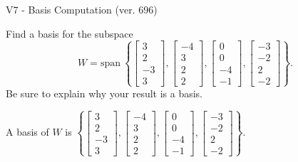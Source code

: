 \begin{exercise}
  \begin{exerciseTitle}V7 - Basis Computation (ver. 696)\end{exerciseTitle}
  \begin{exerciseStatement}
    Find a basis for the subspace 
\[W=\mathrm{span}\ \left\{\left[\begin{array}{r}
3 \\
2 \\
-3 \\
3
\end{array}\right] , \left[\begin{array}{r}
-4 \\
3 \\
2 \\
2
\end{array}\right] , \left[\begin{array}{r}
0 \\
0 \\
-4 \\
-1
\end{array}\right] , \left[\begin{array}{r}
-3 \\
-2 \\
2 \\
-2
\end{array}\right]\right\}.\]
 Be sure to explain why your result is a basis.


  \end{exerciseStatement}
  \begin{exerciseAnswer}
   A basis of \(W\) is  \(\left\{\left[\begin{array}{r}
3 \\
2 \\
-3 \\
3
\end{array}\right] , \left[\begin{array}{r}
-4 \\
3 \\
2 \\
2
\end{array}\right] , \left[\begin{array}{r}
0 \\
0 \\
-4 \\
-1
\end{array}\right] , \left[\begin{array}{r}
-3 \\
-2 \\
2 \\
-2
\end{array}\right]\right\}\).
  


  \end{exerciseAnswer}
\end{exercise}